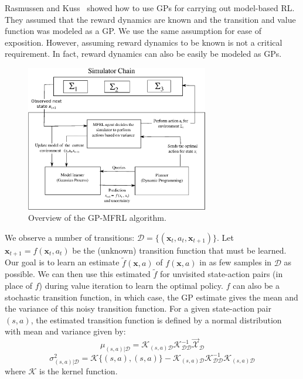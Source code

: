 \documentclass[12pt]{report}
\begin{document}
Rasmussen and Kuss~\cite{rasmussen2003gaussian} showed how to use GPs for carrying out model-based RL. They assumed that the reward dynamics are known and the transition and value function was modeled as a GP. We use the same assumption for ease of exposition. However, assuming reward dynamics to be known is not a critical requirement. In fact, reward dynamics can also be easily be modeled as GPs.

\begin{figure}[htp]
	\centering
	\includegraphics[width=8cm]{gp-mfrl.eps}
	\caption {Overview of the GP-MFRL algorithm. }
   \label{fig:gp_mfrl_system}
\end{figure}

We observe a number of transitions: $\mathcal{D} = \{(\textbf{x}_t, a_t, \textbf{x}_{t+1})\}$. Let $\textbf{x}_{t+1} = f(\textbf{x}_t, a_t)$ be the (unknown) transition function that must be learned. Our goal is to learn an estimate $\tilde{f}(\textbf{x}, a)$ of $f(\textbf{x}, a)$ in as few samples in $\mathcal{D}$ as possible. We can then use this estimated $\tilde{f}$ for unvisited state-action pairs (in place of $f$) during value iteration to learn the optimal policy. $f$ can also be a stochastic transition function, in which case, the GP estimate gives the mean and the variance of this noisy transition function. For a given state-action pair $(s,a)$, the estimated transition function is defined by a normal distribution with mean and variance given by:
\begin{equation}\label{gaussian_mean}
\mu_{(s,a)|\mathcal{D}} = \mathcal{K}_{(s,a)\mathcal{D}}\mathcal{K}^{-1}_{\mathcal{D}\mathcal{D}}\vec{\mathcal{X}}_{\mathcal{D}} 
\end{equation}
\begin{equation}\label{gaussian_variance}
\sigma^2_{(s,a)|\mathcal{D}} = \mathcal{K}\{(s,a),(s,a)\}-\mathcal{K}_{(s,a)\mathcal{D}}\mathcal{K}^{-1}_{\mathcal{D}\mathcal{D}}\mathcal{K}_{(s,a)\mathcal{D}}
\end{equation}
where $\mathcal{K}$ is the kernel function.
\end{document}
